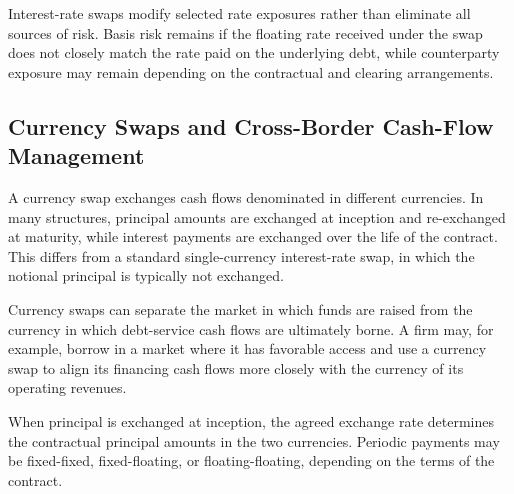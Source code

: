 Interest-rate swaps modify selected rate exposures rather than eliminate all sources of risk. Basis risk remains if the floating rate received under the swap does not closely match the rate paid on the underlying debt, while counterparty exposure may remain depending on the contractual and clearing arrangements.

\subsection{Currency Swaps and Cross-Border Cash-Flow Management}

A currency swap exchanges cash flows denominated in different currencies. In many structures, principal amounts are exchanged at inception and re-exchanged at maturity, while interest payments are exchanged over the life of the contract. This differs from a standard single-currency interest-rate swap, in which the notional principal is typically not exchanged.

Currency swaps can separate the market in which funds are raised from the currency in which debt-service cash flows are ultimately borne. A firm may, for example, borrow in a market where it has favorable access and use a currency swap to align its financing cash flows more closely with the currency of its operating revenues.

When principal is exchanged at inception, the agreed exchange rate determines the contractual principal amounts in the two currencies. Periodic payments may be fixed-fixed, fixed-floating, or floating-floating, depending on the terms of the contract.

